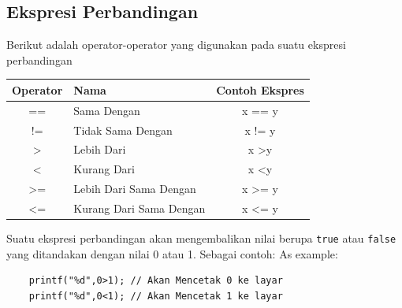\subsection{Ekspresi Perbandingan}
Berikut adalah operator-operator yang digunakan pada suatu ekspresi perbandingan
\begin{center}
	\begin{tabular}{|c|l|c|}
		\hline
		Operator        & Nama                    & \multicolumn{1}{l|}{Contoh Ekspres} \\ \hline
		==              & Sama Dengan             & x == y                              \\ \hline
		!=              & Tidak Sama Dengan       & x != y                              \\ \hline
		\textgreater{}  & Lebih Dari              & x \textgreater y                    \\ \hline
		\textless{}     & Kurang Dari             & x \textless y                       \\ \hline
		\textgreater{}= & Lebih Dari Sama Dengan  & x \textgreater{}= y                 \\ \hline
		\textless{}=    & Kurang Dari Sama Dengan & x \textless{}= y                    \\ \hline
	\end{tabular}
\end{center}

Suatu ekspresi perbandingan akan mengembalikan nilai berupa \verb|true| atau \verb|false| yang ditandakan dengan nilai 0 atau 1.
Sebagai contoh:
As example:
\begin{verbatim}
    printf("%d",0>1); // Akan Mencetak 0 ke layar
    printf("%d",0<1); // Akan Mencetak 1 ke layar 
\end{verbatim}

